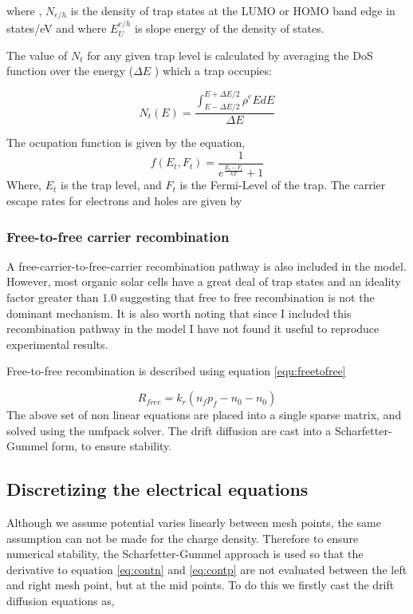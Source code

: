 \documentclass[11pt]{article}
\begin{document}
where , $N_{e/h}$ is the density of trap states at the LUMO or HOMO band edge
in states/eV and where $E_{U}^{e/h}$ is slope energy of the density of states. 

The value of $N_{t}$ for any given trap level is calculated by averaging the DoS function over the energy ($\Delta E$ ) which a trap occupies:

\begin{equation}
\label{eq:taile}
N_{t}(E)=\frac{\int^{E+\Delta E/2}_{E-\Delta E/2} \rho^{e}{E} dE}{\Delta E}
\end{equation}

The ocupation function is given by the equation,
\begin{equation}
f(E_{t},F_{t})=\frac{1}{e^{\frac{E_{t}-F_{t}}{kT}}+1}
\end{equation}
Where, $E_{t}$ is the trap level, and $F_{t}$ is the Fermi-Level of the trap.
The carrier escape rates for electrons and holes are given by


\subsubsection{Free-to-free carrier recombination}
A free-carrier-to-free-carrier recombination pathway is also included in the model. However, most organic solar cells have a great deal of trap states and an ideality factor greater than 1.0 suggesting that free to free recombination is not the dominant mechanism.  It is also worth noting that since I included this recombination pathway in the model I have not found it useful to reproduce experimental results.

Free-to-free recombination is described using equation \ref{equ:freetofree}

\begin{equation}
R_{free}=k_{r}(n_{f}p_{f}-n_{0}-n_{0})
\label{equ:freetofree}
\end{equation}
The above set of non linear equations are placed into a single sparse matrix, and solved using the umfpack solver. The drift diffusion are cast into a Scharfetter-Gummel form, to ensure stability.


\subsection{Discretizing the electrical equations}
Although we assume potential varies linearly between mesh points, the same assumption can not be made for the charge density.  Therefore to ensure numerical stability, the Scharfetter-Gummel approach is used so that the derivative to equation \ref{eq:contn} and \ref{eq:contp} are not evaluated between the left and right mesh point, but at the mid points. To do this we firstly cast the drift diffusion equations as,
\end{document}
